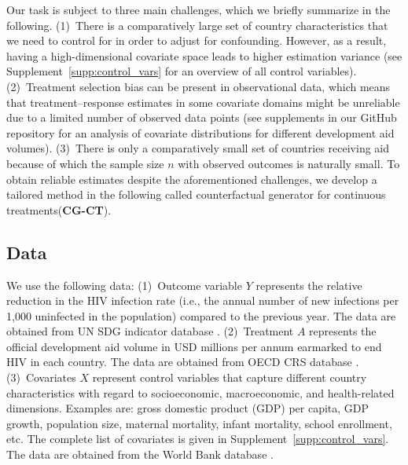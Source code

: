 \documentclass[sigconf]{acmart}
\newcommand{\framework}{\textbf{\mbox{CG-CT}}\xspace}
\newcommand{\frameworklong}{counterfactual generator for continuous treatments\xspace}
\begin{document}
Our task is subject to three main challenges, which we briefly summarize in the following. (1)~There is a comparatively large set of country characteristics that we need to control for in order to adjust for confounding. However, as a result, having a high-dimensional covariate space leads to higher estimation variance (see Supplement~\ref{supp:control_vars} for an overview of all control variables). (2)~Treatment selection bias can be present in observational data, which means that treatment--response estimates in some covariate domains might be unreliable due to a limited number of observed data points (see supplements in our GitHub repository for an analysis of covariate distributions for different development aid volumes). (3)~There is only a comparatively small set of countries receiving aid because of which the sample size $n$ with observed outcomes is naturally small. To obtain reliable estimates despite the aforementioned challenges, we develop a tailored method in the following called \frameworklong (\framework).  

\subsection{Data} 




We use the following data: 
(1)~Outcome variable $Y$ represents the relative reduction in the HIV infection rate (i.e., the annual number of new infections per 1,000 uninfected in the population) compared to the previous year. The data are obtained from UN SDG indicator database \cite{UNsdgdata2022}.
(2)~Treatment $A$ represents the official development aid volume in USD millions per annum earmarked to end HIV in each country. The data are obtained from OECD CRS database \cite{OECDsdgdata2022}.
(3)~Covariates $X$ represent control variables that capture different country characteristics with regard to socioeconomic, macroeconomic, and health-related dimensions. Examples are: gross domestic product (GDP) per capita, GDP growth, population size, maternal mortality, infant mortality, school enrollment, etc. The complete list of covariates is given in Supplement~\ref{supp:control_vars}. The data are obtained from the World Bank database \cite{WBdata2022}.
\end{document}
